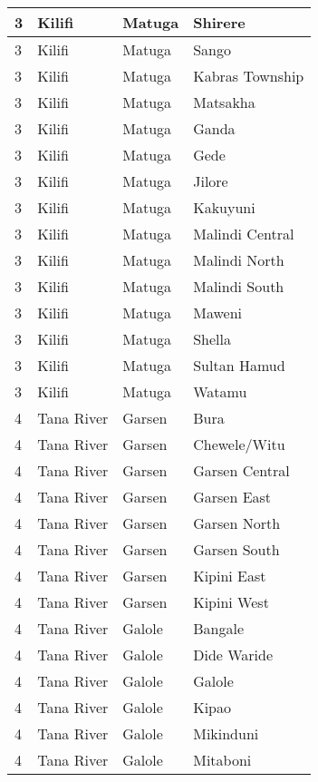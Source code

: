 \begin{table}[!ht]
\begin{tabular}{|l|l|l|l|}
        3 & Kilifi & Matuga & Shirere \\ \hline
        3 & Kilifi & Matuga & Sango \\ \hline
        3 & Kilifi & Matuga & Kabras Township \\ \hline
        3 & Kilifi & Matuga & Matsakha \\ \hline
        3 & Kilifi & Matuga & Ganda \\ \hline
        3 & Kilifi & Matuga & Gede \\ \hline
        3 & Kilifi & Matuga & Jilore \\ \hline
        3 & Kilifi & Matuga & Kakuyuni \\ \hline
        3 & Kilifi & Matuga & Malindi Central \\ \hline
        3 & Kilifi & Matuga & Malindi North \\ \hline
        3 & Kilifi & Matuga & Malindi South \\ \hline
        3 & Kilifi & Matuga & Maweni \\ \hline
        3 & Kilifi & Matuga & Shella \\ \hline
        3 & Kilifi & Matuga & Sultan Hamud \\ \hline
        3 & Kilifi & Matuga & Watamu \\ \hline
        4 & Tana River & Garsen & Bura \\ \hline
        4 & Tana River & Garsen & Chewele/Witu \\ \hline
        4 & Tana River & Garsen & Garsen Central \\ \hline
        4 & Tana River & Garsen & Garsen East \\ \hline
        4 & Tana River & Garsen & Garsen North \\ \hline
        4 & Tana River & Garsen & Garsen South \\ \hline
        4 & Tana River & Garsen & Kipini East \\ \hline
        4 & Tana River & Garsen & Kipini West \\ \hline
        4 & Tana River & Galole & Bangale \\ \hline
        4 & Tana River & Galole & Dide Waride \\ \hline
        4 & Tana River & Galole & Galole \\ \hline
        4 & Tana River & Galole & Kipao \\ \hline
        4 & Tana River & Galole & Mikinduni \\ \hline
        4 & Tana River & Galole & Mitaboni \\ \hline

\end{tabular}
\end{table}
